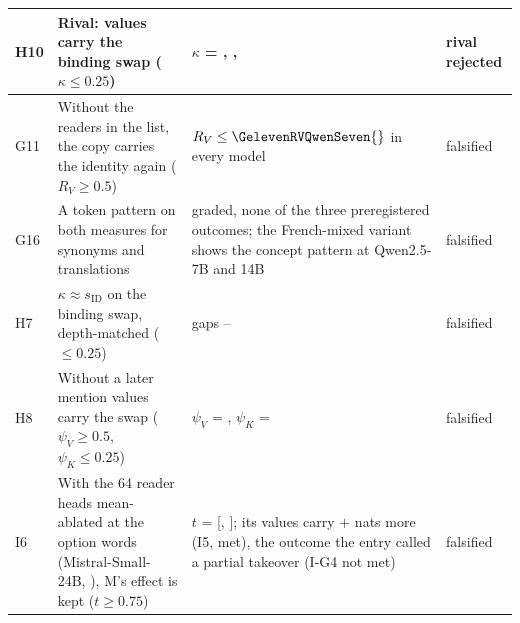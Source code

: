 \begin{table}[p]
\begin{tabular}{@{}l p{} p{} p{}@{}}
H10 & Rival: values carry the binding swap ($\kappa \leq 0.25$) & $\kappa$ = \PkKappaBindNone{}, \PkKappaBindQnames{}, \PkKappaBindOpt{} & rival rejected \\
\midrule
G11 & Without the readers in the list, the copy carries the identity again ($R_V \geq 0.5$) & $R_V \leq \GelevenRVQwenSeven{}$ in every model & falsified \\
G16 & A token pattern on both measures for synonyms and translations & graded, none of the three preregistered outcomes; the French-mixed variant shows the concept pattern at Qwen2.5-7B and 14B & falsified \\
H7 & $\kappa \approx s_{\mathrm{ID}}$ on the binding swap, depth-matched ($\leq 0.25$) & gaps \HsevenGapMin{}--\HsevenGapMax{} & falsified \\
H8 & Without a later mention values carry the swap ($\psi_V \geq 0.5$, $\psi_K \leq 0.25$) & $\psi_V$ = \HeightPsiV{}, $\psi_K$ = \HeightPsiK{} & falsified \\
I6 & With the 64 reader heads mean-ablated at the option words (Mistral-Small-24B, \fmtOpt{}), M's effect is kept ($t \geq 0.75$) & $t$ = \IsixT{} [\IsixTLo{}, \IsixTHi{}]; its values carry $+$\IfiveDV{} nats more (I5, met), the outcome the entry called a partial takeover (I-G4 not met) & falsified \\
\bottomrule
\end{tabular}
\end{table}

